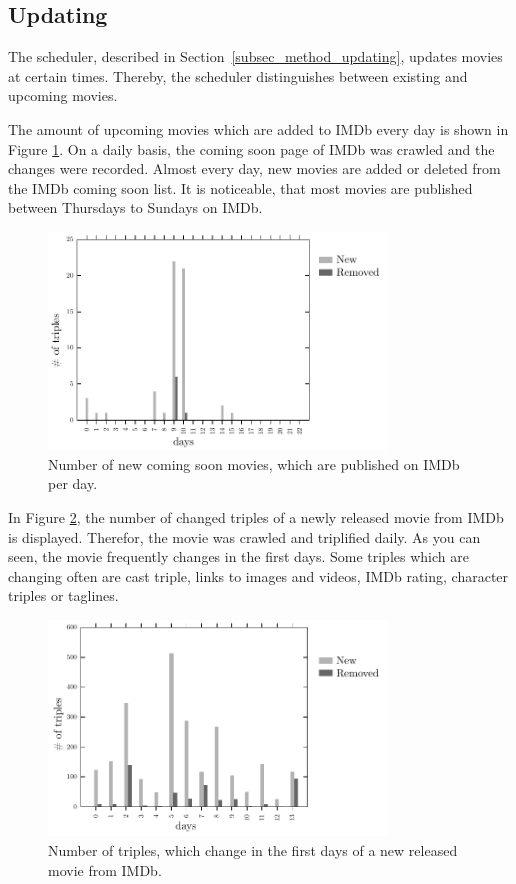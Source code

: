 \subsection{Updating}
\label{subsec_evaluation_updating}

The scheduler, described in Section~\ref{subsec_method_updating}, updates movies at certain times.
Thereby, the scheduler distinguishes between existing and upcoming movies.

The amount of upcoming movies which are added to IMDb every day is shown in Figure \ref{fig_coming_soon_movie}.
On a daily basis, the coming soon page of IMDb was crawled and the changes were recorded.
Almost every day, new movies are added or deleted from the IMDb coming soon list.
It is noticeable, that most movies are published between Thursdays to Sundays on IMDb.

\begin{figure}[h!]
  \begin{center}
  \includegraphics[width=0.8\textwidth]{images/updating_1.pdf}
  \end{center}
  \caption{Number of new coming soon movies, which are published on IMDb per day.}
  \label{fig_coming_soon_movie}
\end{figure}

In Figure \ref{fig_new_movie}, the number of changed triples of a newly released movie from IMDb is displayed.
Therefor, the movie was crawled and triplified daily.
As you can seen, the movie frequently changes in the first days.
Some triples which are changing often are cast triple, links to images and videos, IMDb rating, character triples or taglines.

\begin{figure}[h!]
  \begin{center}
  \includegraphics[width=0.8\textwidth]{images/updating_2.pdf}
  \end{center}
  \caption{Number of triples, which change in the first days of a new released movie from IMDb.}
  \label{fig_new_movie}
\end{figure}
